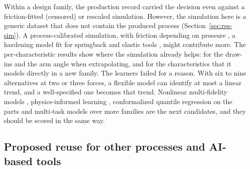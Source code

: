 \documentclass[pdflatex,sn-basic,lineno]{sn-jnl}
\begin{document}
Within a design family, the production record carried the decision even against a friction-fitted (censored) or rescaled simulation. However, the simulation here is a generic dataset that does not contain the produced process (Section~\ref{sec:res-sim}). A process-calibrated simulation, with friction depending on pressure \citep{hol2012advanced}, a hardening model fit for springback \citep{wagoner2013advanced} and elastic tools \citep{pilthammar2018introduction}, might contribute more. The per-characteristic results show where the simulation already helps: for the draw-ins and the arm angle when extrapolating, and for the characteristics that it models directly in a new family. The learners failed for a reason. With six to nine alternatives at two or three forces, a flexible model can identify at most a linear trend, and a well-specified one becomes that trend. Nonlinear multi-fidelity models \citep{perdikaris2017nonlinear}, physics-informed learning \citep{karniadakis2021physics}, conformalized quantile regression on the parts \citep{romano2019conformalized} and multi-task models over more families \citep{bonilla2008multi} are the next candidates, and they should be scored in the same way.

\subsection{Proposed reuse for other processes and AI-based tools}\label{sec:reuse}
\end{document}
